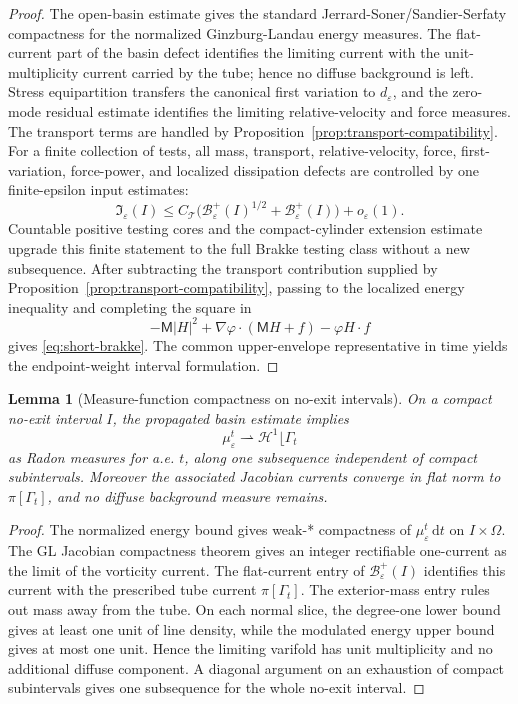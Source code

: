 \documentclass[11pt]{article}
\newtheorem{lemma}[theorem]{Lemma}
\theoremstyle{definition}
\newcommand{\dd}{\,\mathrm d}
\newcommand{\eps}{\varepsilon}
\newcommand{\Basin}{\mathcal B}
\newcommand{\Mmob}{\mathsf M}
\newcommand{\Hh}{\mathcal H}
\begin{document}
\begin{proof}
The open-basin estimate gives the standard
Jerrard-Soner/Sandier-Serfaty compactness for the normalized Ginzburg-Landau
energy measures.  The flat-current part of the basin defect identifies the
limiting current with the unit-multiplicity current carried by the tube; hence
no diffuse background is left.  Stress equipartition transfers the canonical
first variation to \(d_\eps\), and the zero-mode residual estimate identifies
the limiting relative-velocity and force measures.  The transport terms are
handled by Proposition~\ref{prop:transport-compatibility}.  For a finite
collection of tests, all mass, transport, relative-velocity, force,
first-variation, force-power, and localized dissipation defects are controlled
by one finite-epsilon input estimates:
\[
        \mathfrak I_\eps(I)
        \le
        C_{\mathscr T}
        \bigl(
        \Basin_\eps^+(I)^{1/2}
        +
        \Basin_\eps^+(I)
        \bigr)
        +
        o_\eps(1).
\]
Countable positive testing cores and the compact-cylinder extension estimate
upgrade this finite statement to the full Brakke testing class without a new
subsequence.  After subtracting the transport contribution supplied by
Proposition~\ref{prop:transport-compatibility}, passing to the localized energy
inequality and completing the square in
\[
        -\Mmob |H|^2+\nabla\varphi\cdot(\Mmob H+f)
        -\varphi H\cdot f
\]
gives \eqref{eq:short-brakke}.  The common upper-envelope representative in
time yields the endpoint-weight interval formulation.
\end{proof}

\begin{lemma}[Measure-function compactness on no-exit intervals]
\label{lem:short-measure-function}
On a compact no-exit interval \(I\), the propagated basin estimate implies
\[
        \mu_\eps^t
        \rightharpoonup
        \Hh^1\lfloor\Gamma_t
\]
as Radon measures for a.e. \(t\), along one subsequence independent of compact
subintervals.  Moreover the associated Jacobian currents converge in flat norm
to \(\pi[\Gamma_t]\), and no diffuse background measure remains.
\end{lemma}

\begin{proof}
The normalized energy bound gives weak-* compactness of
\(\mu_\eps^t\dd t\) on \(I\times\Omega\).  The GL Jacobian compactness theorem
gives an integer rectifiable one-current as the limit of the vorticity current.
The flat-current entry of \(\Basin_\eps^+(I)\) identifies this current with the
prescribed tube current \(\pi[\Gamma_t]\).  The exterior-mass entry rules out
mass away from the tube.  On each normal slice, the degree-one lower bound gives
at least one unit of line density, while the modulated energy upper bound gives
at most one unit.  Hence the limiting varifold has unit multiplicity and no
additional diffuse component.  A diagonal argument on an exhaustion of compact
subintervals gives one subsequence for the whole no-exit interval.
\end{proof}
\end{document}
